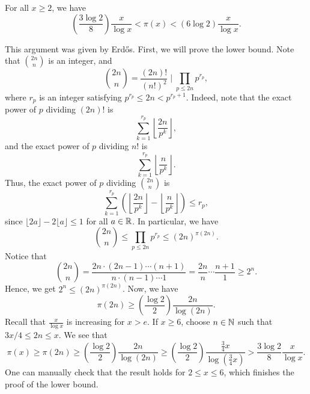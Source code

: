 \begin{thm}\label{thm:1.13}
For all $x \geq 2$, we have 
\[ \left( \frac{3\log 2}8 \right) \frac{x}{\log x} < \pi(x) < (6\log 2) \frac{x}{\log x}. \]
\end{thm}
\begin{pf}
This argument was given by Erd\H{o}s. First, we will prove the lower bound. Note that $\binom{2n}n$ is 
an integer, and 
\[ \binom{2n}n = \frac{(2n)!}{(n!)^2} \; \bigg\rvert \; \prod_{p\leq 2n} p^{r_p}, \]
where $r_p$ is an integer satisfying $p^{r_p} \leq 2n < p^{r_p+1}$. Indeed, note that 
the exact power of $p$ dividing $(2n)!$ is 
\[ \sum_{k=1}^{r_p} \left\lfloor \frac{2n}{p^k} \right\rfloor, \]
and the exact power of $p$ dividing $n!$ is 
\[ \sum_{k=1}^{r_p} \left\lfloor \frac{n}{p^k} \right\rfloor. \]
Thus, the exact power of $p$ dividing $\binom{2n}n$ is 
\[ \sum_{k=1}^{r_p} \left( \left\lfloor \frac{2n}{p^k} \right\rfloor -  \left\lfloor \frac{n}{p^k} \right\rfloor \right) \leq r_p, \] 
since $\lfloor 2a \rfloor - 2\lfloor a \rfloor \leq 1$ for all $a \in \mathbb{R}$. In particular, we have 
\[ \binom{2n}n \leq \prod_{p \leq 2n} p^{r_p} \leq (2n)^{\pi(2n)}. \]
Notice that 
\[ \binom{2n}n = \frac{2n \cdot (2n-1) \cdots (n+1)}{n \cdot (n-1) \cdots 1} = \frac{2n}n \cdots 
\frac{n+1}1 \geq 2^n. \]
Hence, we get $2^n \leq (2n)^{\pi(2n)}$. Now, we have 
\[ \pi(2n) \geq \left( \frac{\log 2}2 \right) \frac{2n}{\log(2n)}. \]
Recall that $\frac{x}{\log x}$ is increasing for $x > e$. If $x \geq 6$, choose $n \in \mathbb{N}$ such that 
$3x/4 \leq 2n \leq x$. We see that 
\[ \pi(x) \geq \pi(2n) \geq \left( \frac{\log 2}2 \right) \frac{2n}{\log(2n)} 
\geq \left( \frac{\log 2}2 \right) \frac{\frac34x}{\log(\frac34x)} > \frac{3\log 2}8 \frac{x}{\log x}. \]
One can manually check that the result holds for $2 \leq x \leq 6$, which finishes the proof of the lower 
bound. 


\end{pf}
